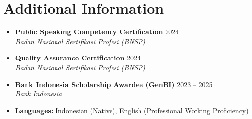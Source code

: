 \documentclass[11pt,a4paper]{article}
\begin{document}
\section*{Additional Information}
\begin{itemize}
    \item \textbf{Public Speaking Competency Certification} \hfill 2024 \\
    \textit{Badan Nasional Sertifikasi Profesi (BNSP)}
    
    \item \textbf{Quality Assurance Certification} \hfill 2024 \\
    \textit{Badan Nasional Sertifikasi Profesi (BNSP)}
    
    \item \textbf{Bank Indonesia Scholarship Awardee (GenBI)} \hfill 2023 -- 2025 \\
    \textit{Bank Indonesia}
    
    \item \textbf{Languages:} Indonesian (Native), English (Professional Working Proficiency)
\end{itemize}
\end{document}
